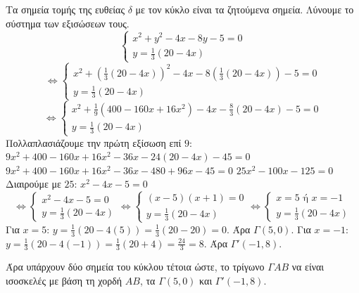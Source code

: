 Τα σημεία τομής της ευθείας $\delta$ με τον κύκλο είναι τα ζητούμενα σημεία.
Λύνουμε το σύστημα των εξισώσεων τους.
\[
\begin{cases}
x^2 + y^2 - 4x - 8y - 5 = 0 \\
y = \frac{1}{3}(20 - 4x)
\end{cases}
\]
\[
\Leftrightarrow
\begin{cases}
x^2 + \left(\frac{1}{3}(20 - 4x)\right)^2 - 4x - 8\left(\frac{1}{3}(20 - 4x)\right) - 5 = 0 \\
y = \frac{1}{3}(20 - 4x)
\end{cases}
\]
\[
\Leftrightarrow
\begin{cases}
x^2 + \frac{1}{9}(400 - 160x + 16x^2) - 4x - \frac{8}{3}(20 - 4x) - 5 = 0 \\
y = \frac{1}{3}(20 - 4x)
\end{cases}
\]
Πολλαπλασιάζουμε την πρώτη εξίσωση επί $9$:
$9x^2 + 400 - 160x + 16x^2 - 36x - 24(20 - 4x) - 45 = 0$
$9x^2 + 400 - 160x + 16x^2 - 36x - 480 + 96x - 45 = 0$
$25x^2 - 100x - 125 = 0$
Διαιρούμε με $25$:
$x^2 - 4x - 5 = 0$
\[
\Leftrightarrow
\begin{cases}
x^2 - 4x - 5 = 0 \\
y = \frac{1}{3}(20 - 4x)
\end{cases}
\Leftrightarrow
\begin{cases}
(x-5)(x+1) = 0 \\
y = \frac{1}{3}(20 - 4x)
\end{cases}
\Leftrightarrow
\begin{cases}
x = 5 \text{ ή } x = -1 \\
y = \frac{1}{3}(20 - 4x)
\end{cases}
\]
Για $x = 5$: $y = \frac{1}{3}(20 - 4(5)) = \frac{1}{3}(20 - 20) = 0$. Άρα $\Gamma(5,0)$.
Για $x = -1$: $y = \frac{1}{3}(20 - 4(-1)) = \frac{1}{3}(20 + 4) = \frac{24}{3} = 8$. Άρα $\Gamma'(-1,8)$.

Άρα υπάρχουν δύο σημεία του κύκλου τέτοια ώστε, το τρίγωνο $\Gamma AB$ να είναι ισοσκελές με βάση τη χορδή $AB$, τα $\Gamma(5,0)$ και $\Gamma'(-1,8)$.\
